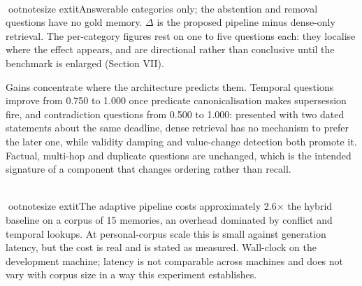 \documentclass[conference]{IEEEtran}
\begin{document}
\begin{table}[!t]
\caption{Mean Reciprocal Rank by Question Category}
\label{tab:viii}
\centering
{}
\\[2pt]ootnotesize	extit{Answerable categories only; the abstention and removal questions have no gold memory. $\Delta$ is the proposed pipeline minus dense-only retrieval. The per-category figures rest on one to five questions each: they localise where the effect appears, and are directional rather than conclusive until the benchmark is enlarged (Section VII).}
\end{table}

Gains concentrate where the architecture predicts them. Temporal questions improve from 0.750 to 1.000 once predicate canonicalisation makes supersession fire, and contradiction questions from 0.500 to 1.000: presented with two dated statements about the same deadline, dense retrieval has no mechanism to prefer the later one, while validity damping and value-change detection both promote it. Factual, multi-hop and duplicate questions are unchanged, which is the intended signature of a component that changes ordering rather than recall.
\begin{table}[!t]
\caption{Latency on the Benchmark Corpus}
\label{tab:ix}
\centering
{}
\\[2pt]ootnotesize	extit{The adaptive pipeline costs approximately 2.6$\times$ the hybrid baseline on a corpus of 15 memories, an overhead dominated by conflict and temporal lookups. At personal-corpus scale this is small against generation latency, but the cost is real and is stated as measured. Wall-clock on the development machine; latency is not comparable across machines and does not vary with corpus size in a way this experiment establishes.}
\end{table}
\end{document}

